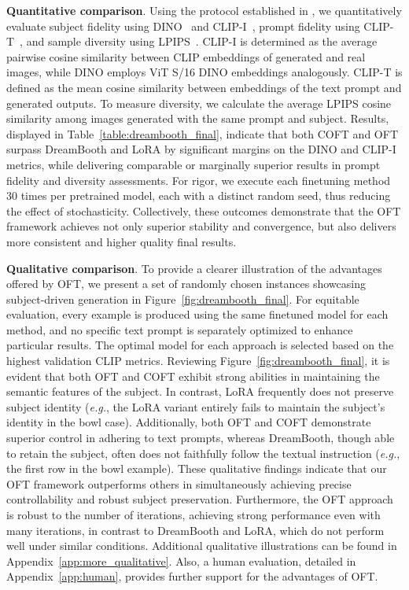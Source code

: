 \textbf{Quantitative comparison}. Using the protocol established in \cite{ruiz2023dreambooth}, we quantitatively evaluate subject fidelity using DINO~\cite{caron2021emerging} and CLIP-I~\cite{radford2021learning}, prompt fidelity using CLIP-T~\cite{radford2021learning}, and sample diversity using LPIPS~\cite{zhang2018unreasonable}. CLIP-I is determined as the average pairwise cosine similarity between CLIP embeddings of generated and real images, while DINO employs ViT S/16 DINO embeddings analogously. CLIP-T is defined as the mean cosine similarity between embeddings of the text prompt and generated outputs. To measure diversity, we calculate the average LPIPS cosine similarity among images generated with the same prompt and subject. Results, displayed in Table~\ref{table:dreambooth_final}, indicate that both COFT and OFT surpass DreamBooth and LoRA by significant margins on the DINO and CLIP-I metrics, while delivering comparable or marginally superior results in prompt fidelity and diversity assessments. For rigor, we execute each finetuning method 30 times per pretrained model, each with a distinct random seed, thus reducing the effect of stochasticity. Collectively, these outcomes demonstrate that the OFT framework achieves not only superior stability and convergence, but also delivers more consistent and higher quality final results.

\textbf{Qualitative comparison}. To provide a clearer illustration of the advantages offered by OFT, we present a set of randomly chosen instances showcasing subject-driven generation in Figure~\ref{fig:dreambooth_final}. For equitable evaluation, every example is produced using the same finetuned model for each method, and no specific text prompt is separately optimized to enhance particular results. The optimal model for each approach is selected based on the highest validation CLIP metrics. Reviewing Figure~\ref{fig:dreambooth_final}, it is evident that both OFT and COFT exhibit strong abilities in maintaining the semantic features of the subject. In contrast, LoRA frequently does not preserve subject identity (\emph{e.g.}, the LoRA variant entirely fails to maintain the subject's identity in the bowl case). Additionally, both OFT and COFT demonstrate superior control in adhering to text prompts, whereas DreamBooth, though able to retain the subject, often does not faithfully follow the textual instruction (\emph{e.g.}, the first row in the bowl example). These qualitative findings indicate that our OFT framework outperforms others in simultaneously achieving precise controllability and robust subject preservation. Furthermore, the OFT approach is robust to the number of iterations, achieving strong performance even with many iterations, in contrast to DreamBooth and LoRA, which do not perform well under similar conditions. Additional qualitative illustrations can be found in Appendix~\ref{app:more_qualitative}. Also, a human evaluation, detailed in Appendix~\ref{app:human}, provides further support for the advantages of OFT.

